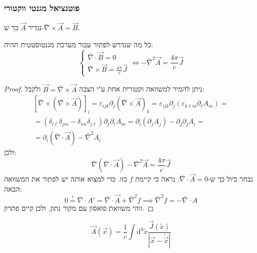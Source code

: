 \documentclass{tstextbook}
\begin{document}
\subsubsection{פוטנציאל מגנטי ווקטורי}

\begin{definition}
נגדיר \(\vec{A}\) כך ש-\(\bar{\nabla} \times \vec{A}=\vec{B}\).

\end{definition}
\begin{proposition}
כל מה שנדרש לפתור עבור מערכת מגנטוסטטית תהיה:
$$\begin{cases} \bar{\nabla} \cdot \vec{B}=0 \\\bar{\nabla} \times \vec{B} = \frac{4\pi}{c}\vec{J}\end{cases}
\iff -\bar{\nabla}^2 \vec{A}=\frac{4\pi}{c}\vec{J}$$

\end{proposition}
\begin{proof}
ניתן להמיר למשוואה וקטורית אחת ע"י הצבה \(\vec{B} = \bar{\nabla} \times \vec{A}\) ולקבל:
$$\begin{gather}\left[ \bar{\nabla} \times \left( \bar{\nabla} \times \vec{A} \right) \right]_{i}=\varepsilon_{ijk}\partial_{j}\left( \bar{\nabla} \times \vec{A} \right)_{k}=\varepsilon_{ijk}\partial_{j}\left( \varepsilon_{k\ell m}\partial_{\ell} A_{m} \right)= \\=\left( \delta_{i\ell} \delta_{jm} - \delta_{im}\delta_{j\ell} \right) \partial_{j}\partial_{\ell} A_{m}=\partial_{i}\left( \partial_{j}A_{j} \right)-\partial_{j}\partial_{j}A_{i}= \\=\partial_{i}\left( \bar{\nabla} \cdot \vec{A} \right)-\bar{\nabla}^2 A_{i}
\end{gather}$$
ולכן:
$$\bar{\nabla} \left( \bar{\nabla} \cdot \vec{A} \right)-\bar{\nabla}^2 \vec{A}=\frac{4\pi}{c}\vec{J}$$
נבחר כיול כך ש-\(\bar{\nabla} \cdot \vec{A}=0\). נראה כי קיימת \(f\) כזו. כדי למצוא אותה יש לפתור את המשוואה הבאה:
$$0\overset{!}{=} \bar{\nabla} \cdot A'=\bar{\nabla} \cdot \vec{A}+\bar{\nabla}^2 f\implies \bar{\nabla}^2 f=-\bar{\nabla} \cdot A$$
זוהי משוואת פואסון עם מקור נתון, ולכן קיים פתרון.

\end{proof}
\begin{proposition}
$$\vec{A}\left( \vec{x} \right)=\frac{1}{c}\int\mathrm{d}^3\tilde{x}  \frac{\vec{J}\left( \tilde{x} \right)}{\left\lvert  \vec{x}-\tilde{\vec{x}}  \right\rvert }$$

\end{proposition}
\end{document}
